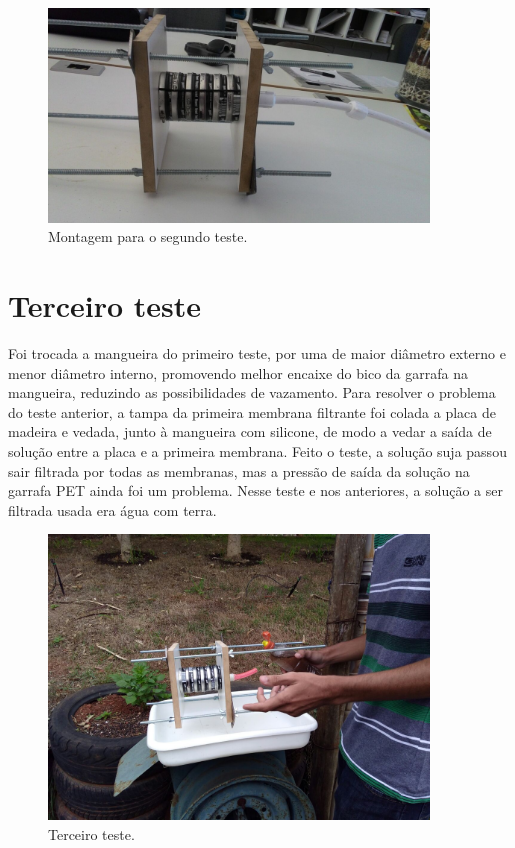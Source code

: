 \begin{figure}[H]
  \centering
  \includegraphics[width=0.9\textwidth]{figuras/segundo_teste.png}
  \caption{Montagem para o segundo teste.\label{fig:segundo_teste}}
\end{figure}


\section{Terceiro teste}\label{sec:terceiro_teste}

Foi trocada a mangueira do primeiro teste, por uma de maior diâmetro externo e
menor diâmetro interno, promovendo melhor encaixe do bico da garrafa na
mangueira, reduzindo as possibilidades de vazamento. Para resolver o problema do
teste anterior, a tampa da primeira membrana filtrante foi colada a placa de
madeira e vedada, junto à mangueira com silicone, de modo a vedar a saída de
solução entre a placa e a primeira membrana. Feito o teste, a solução suja
passou sair filtrada por todas as membranas, mas a pressão de saída da solução
na garrafa PET ainda foi um problema. Nesse teste e nos anteriores, a solução a
ser filtrada usada era água com terra.

\begin{figure}[H]
  \centering
  \includegraphics[width=0.9\textwidth]{figuras/terceiro_teste.png}
  \caption{Terceiro teste.\label{fig:terceiro_teste}}
\end{figure}


